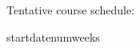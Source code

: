 \documentclass{article}
\begin{document}
Tentative course schedule:
\begin{center}
  \begin{calendar}{startdate}{numweeks}


  \end{calendar}
\end{center}
\end{document}
